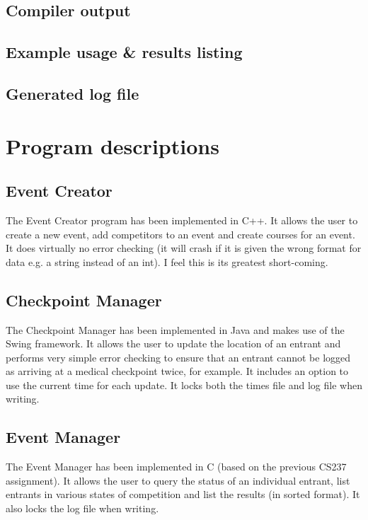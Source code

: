 \documentclass[a4paper, twoside]{article}
\begin{document}
\subsection{Compiler output}

\subsection{Example usage \& results listing}

\subsection{Generated log file}


\newpage

\section{Program descriptions}
\subsection{Event Creator}
The Event Creator program has been implemented in C++. It allows the user to
create a new event, add competitors to an event and create courses for an event.
It does virtually no error checking (it will crash if it is given the wrong
format for data e.g. a string instead of an int). I feel this is its greatest
short-coming.
\subsection{Checkpoint Manager}
The Checkpoint Manager has been implemented in Java and makes use of the Swing
framework. It allows the user to update the location of an entrant and performs
very simple error checking to ensure that an entrant cannot be logged as
arriving at a medical checkpoint twice, for example. It includes an option to
use the current time for each update. It locks both the times file and log file
when writing.
\subsection{Event Manager}
The Event Manager has been implemented in C (based on the previous CS237
assignment). It allows the user to query the status of an individual entrant,
list entrants in various states of competition and list the results (in sorted
format). It also locks the log file when writing.
\end{document}
